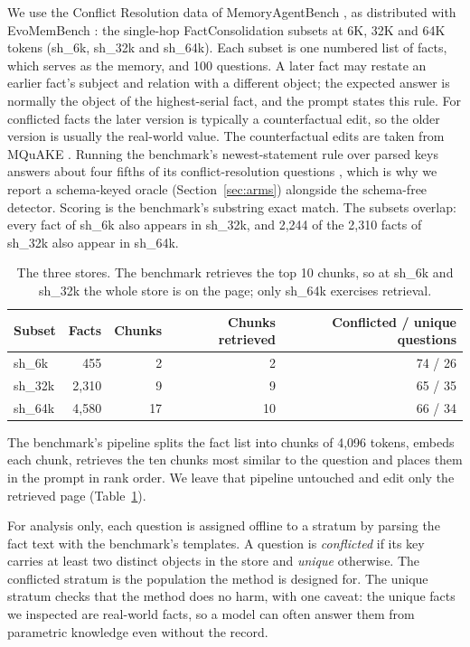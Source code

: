 \documentclass{CUP-JNL-NLP}
\newcommand{\sub}[1]{\textsf{sh\_#1}}                    %
\begin{document}
We use the Conflict Resolution data of MemoryAgentBench \citep{hu2026memoryagentbench}, as distributed with EvoMemBench \citep{wang2026evomembench}: the single-hop FactConsolidation subsets at 6K, 32K and 64K tokens (\sub{6k}, \sub{32k} and \sub{64k}). Each subset is one numbered list of facts, which serves as the memory, and 100 questions. A later fact may restate an earlier fact's subject and relation with a different object; the expected answer is normally the object of the highest-serial fact, and the prompt states this rule. For conflicted facts the later version is typically a counterfactual edit, so the older version is usually the real-world value. The counterfactual edits are taken from MQuAKE \citep{zhong2023mquake}. Running the benchmark's newest-statement rule over parsed keys answers about four fifths of its conflict-resolution questions \citep{pakhomov2026bookkeeping}, which is why we report a schema-keyed oracle (Section~\ref{sec:arms}) alongside the schema-free detector. Scoring is the benchmark's substring exact match. The subsets overlap: every fact of \sub{6k} also appears in \sub{32k}, and 2,244 of the 2,310 facts of \sub{32k} also appear in \sub{64k}.

\begin{table}[tbp]\centering
\caption{The three stores. The benchmark retrieves the top 10 chunks, so at \sub{6k} and \sub{32k} the whole store is on the page; only \sub{64k} exercises retrieval.}
\label{tab:stores}
\begin{tabular}{lrrrr}\toprule
Subset & Facts & Chunks & Chunks retrieved & Conflicted / unique questions\\\midrule
\sub{6k}  & 455   & 2  & 2  & 74 / 26\\
\sub{32k} & 2,310 & 9  & 9  & 65 / 35\\
\sub{64k} & 4,580 & 17 & 10 & 66 / 34\\\bottomrule
\end{tabular}\end{table}

The benchmark's pipeline splits the fact list into chunks of 4,096 tokens, embeds each chunk, retrieves the ten chunks most similar to the question and places them in the prompt in rank order. We leave that pipeline untouched and edit only the retrieved page (Table~\ref{tab:stores}).

For analysis only, each question is assigned offline to a stratum by parsing the fact text with the benchmark's templates. A question is \emph{conflicted} if its key carries at least two distinct objects in the store and \emph{unique} otherwise. The conflicted stratum is the population the method is designed for. The unique stratum checks that the method does no harm, with one caveat: the unique facts we inspected are real-world facts, so a model can often answer them from parametric knowledge even without the record.
\end{document}
